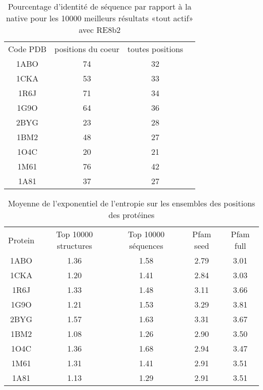     \begin{table}[!htbp]
      \centering

      \begin{tabular}{cccc}

        \toprule
        Code PDB & positions  du coeur & toutes positions\\
        \cmidrule{1-3}
        1ABO & 74	 &  32 \\
        1CKA & 53	 &  33 \\
        1R6J & 71	 &  34 \\
        1G9O & 64	 &  36 \\
        2BYG & 23	 &  28 \\
        1BM2 & 48	 &  27 \\
        1O4C & 20	 &  21 \\
        1M61 & 76	 &  42 \\
        1A81 & 37	 &  27 \\
        \bottomrule

      \end{tabular}      
      \caption{Pourcentage d'identité de séquence par rapport à la native pour les 10000 meilleurs résultats «tout actif» avec RE8b2}
\label{tab:protéines}      
    \end{table}



    \begin{table}[!htbp]
      \centering

      \begin{tabular}{ccccc}

        \toprule
        Protein & Top 10000 structures & Top 10000 séquences & Pfam seed & Pfam full \\
        \cmidrule{1-5}
        1ABO & 1.36 & 1.58 & 2.79 & 3.01 \\
        1CKA & 1.20 & 1.41 & 2.84 & 3.03 \\
        1R6J & 1.33 & 1.48 & 3.11 & 3.66 \\
        1G9O & 1.21 & 1.53 & 3.29 & 3.81 \\
        2BYG & 1.57 & 1.63 & 3.31 & 3.67 \\
        1BM2 & 1.08 & 1.26 & 2.90 & 3.50 \\
        1O4C & 1.36 & 1.68 & 2.94 & 3.47 \\
        1M61 & 1.31 & 1.41 & 2.91 & 3.51 \\
        1A81 & 1.13 & 1.29 & 2.91 & 3.51 \\
        \bottomrule

      \end{tabular}      
      \caption{Moyenne de l'exponentiel de l'entropie sur les ensembles des positions des protéines}
\label{tab:protéines}      
    \end{table}

